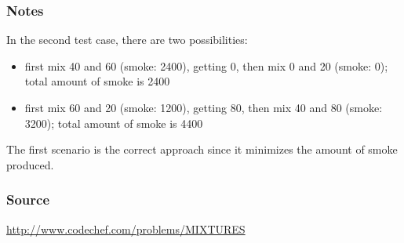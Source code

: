 \subsubsection*{Notes}
In the second test case, there are two possibilities:
\begin{itemize}
    \item first mix 40 and 60 (smoke: 2400), getting 0,
        then mix 0 and 20 (smoke: 0); total amount of smoke is 2400
    \item first mix 60 and 20 (smoke: 1200), getting 80,
        then mix 40 and 80 (smoke: 3200);
        total amount of smoke is 4400
\end{itemize}

The first scenario is the correct approach since
it minimizes the amount of smoke produced.

\subsubsection*{Source} \url{http://www.codechef.com/problems/MIXTURES}
